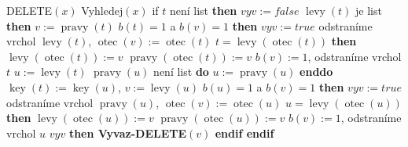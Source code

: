 \documentclass[a4paper,12pt]{article}
\DeclareMathOperator*{\otec}{otec}
\DeclareMathOperator*{\levy}{levy}
\DeclareMathOperator*{\pravy}{pravy}
\DeclareMathOperator*{\key}{key}
\begin{document}
{{DELETE$(x)$\newline 
Vyhledej$(x)$\newline 
\textsf{if}} $t$ není list {\bf \textsf{then}}\newline 
\phantom{---}$vyv:=false$ \newline 
{} $\levy(t)$ je list {\bf \textsf{then}}\newline 
\phantom{------}$v:=\pravy(t)$\newline 
{} $b(t)=1$ a $b(v)=1$ {\bf \textsf{then}}\newline 
\phantom{---------}$vyv:=true$\newline 
{}\newline 
\phantom{------}odstraníme vrchol $\levy(t)$, $\otec(v):=\otec(t)$\newline 
{} $t=\levy(\otec(t))$ {\bf \textsf{then}}\newline 
\phantom{---------}$\levy(\otec(t)):=v$\newline 
{}\newline 
\phantom{---------}$\pravy(\otec(t)):=v$\newline 
{}\newline 
\phantom{------}$b(v):=1$, odstraníme vrchol $t$\newline 
{}\newline 
\phantom{------}$u:=\levy(t)$\newline 
{} $\pravy(u)$ není list {\bf \textsf{do}} $u:=\pravy(u)$ {\bf \textsf{enddo}}\newline 
\phantom{------}$\key(t):=\key(u)$, $v:=\levy(u)$ \newline 
{} $b(u)=1$ a $b(v)=1$ {\bf \textsf{then}}\newline 
\phantom{---------}$vyv:=true$\newline 
{}\newline 
\phantom{------}odstraníme vrchol $\pravy(u)$, $\otec(v):=\otec(u)$\newline
{} $u=\levy(\otec(u))$ {\bf \textsf{then}}\newline 
\phantom{---------}$\levy(\otec(u)):=v$\newline 
{}\newline 
\phantom{---------}$\pravy(\otec(u)):=v$\newline 
{}\newline 
\phantom{------}$b(v):=1$, odstraníme vrchol $u$\newline 
{} \newline 
{} $vyv$ {\bf \textsf{then} Vyvaz-DELETE$(v)$ \textsf{endif}\newline 
\textsf{endif}}

}
\end{document}
